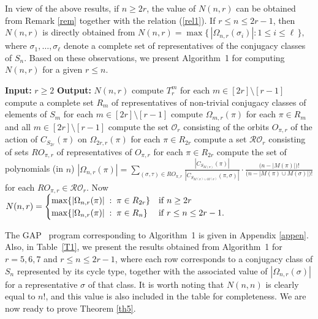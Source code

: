 \documentclass{amsart}
\newcommand{\Input}{\State \textbf{Input:} }
\newcommand{\Output}{\State \textbf{Output:} }
\numberwithin{equation}{section}
\begin{document}
In view of the above results, if $n \geq 2r$, the value of $N(n,r)$ can be obtained from Remark \ref{rem} together with the relation (\ref{rel1}).  
If $r \leq n \leq 2r-1$, then $N(n,r)$ is directly obtained from 
$
   N(n,r) = \max \bigl\{\, |\Omega_{n,r}(\sigma_i)| : 1 \leq i \leq \ell \,\bigr\},
$
where $\sigma_1, \ldots, \sigma_\ell$ denote a complete set of representatives of the conjugacy classes of $S_n$.  
Based on these observations, we present Algorithm~1 for computing $N(n,r)$ for a given $r\leq n$.


\begin{algorithm}
		\caption{Computation of $N(n,r)$ for a given $r\leq n$}\label{algo}
		\begin{algorithmic}[1]

			\Input  $r\geq 2$ 
			\Output $N(n,r)$
			\State compute $T_r^{m}$ for each $m\in [2r]\setminus [r-1]$
			\State compute a complete set $R_m$ of representatives of non-trivial conjugacy classes of elements of $S_{m}$ for each $m\in [2r]\setminus [r-1]$
			\State compute $\Omega_{m,r}(\pi)$ for each $\pi\in R_m$ and all $m\in [2r]\setminus [r-1]$
			\State compute the set $\mathcal{O}_r$  consisting of the orbits $O_{\pi,r}$ of the action of $C_{S_{2r}}(\pi)$ on $\Omega_{2r,r}(\pi)$ for each $\pi\in R_{2r}$
			\State compute a set $\mathcal{RO}_r$ consisting of sets $RO_{\pi,r}$ of representatives of $O_{\pi,r}$ for each $\pi \in R_{2r}$
			\State compute the set of polynomials (in $n$) $|\Omega_{n,r}(\pi)|=\sum_{(\sigma,\tau) \in RO_{\pi,r}} \frac{|C_{S_{M(\pi)}}(\pi)|}{|C_{S_{M(\pi)\cup M(\sigma)}}(\pi,\sigma)|}\cdot \frac{\big(n-|M(\pi)|\big)!}{\big(n-|M(\pi)\cup M(\sigma)|\big)!}$ for each $RO_{\pi,r}\in \mathcal{RO}_r$.
			\State  Now $N(n,r)=\begin{cases}
			 \max\{|\Omega_{n,r}(\pi)| \; : \; \pi \in R_{2r}\} & {\rm if} \; n\geq 2r \\     \max\{|\Omega_{n,r}(\pi)| \; : \; \pi \in R_n\} & {\rm if} \; r\leq n\leq 2r-1. \end{cases}$
			\end{algorithmic}

	\end{algorithm}
The \textsf{GAP}~\cite{GAP} program corresponding to Algorithm~1 is given in  Appendix \ref{appen}. Also, in Table~\ref{T1}, we present the results obtained from Algorithm~1 
for $r=5,6,7$ and $r \leq n \leq 2r-1$, where each row corresponds to a conjugacy 
class of $S_n$ represented by its cycle type, together with the associated value 
of $|\Omega_{n,r}(\sigma)|$ for a representative $\sigma$ of that class. 
It is worth noting that $N(n,n)$ is clearly equal to $n!$, and this value is also included in the table for completeness. We are now ready to prove Theorem \ref{th5}.
\vspace*{.5cm}
\end{document}
